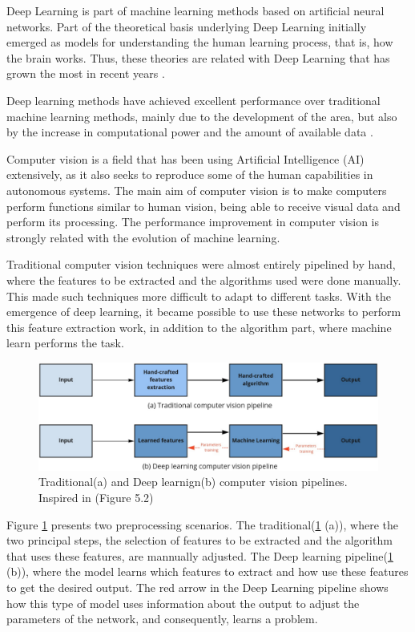 Deep Learning is part of machine learning methods based on artificial neural networks. %
 Part of the theoretical basis underlying Deep Learning  initially emerged as models for understanding the human learning process, that is, how the brain works. Thus, these theories are related with Deep Learning  that has grown the most in recent years \cite{goodfellow2016}.

Deep learning methods have achieved excellent performance over traditional machine learning methods, mainly due to the development of the area, but also by the increase in computational power and the amount of available data \cite{geron2019}. 

Computer vision is a field that has been using Artificial Intelligence (AI) extensively, as it also seeks to reproduce some of the human capabilities in autonomous systems. The main aim of computer vision is to make computers perform functions similar to human vision, being able to receive visual data and perform its processing. The performance improvement in computer vision is strongly related with the evolution of machine learning.

Traditional computer vision techniques were almost entirely pipelined by hand, where the features to be extracted and the algorithms used were done manually. This made such techniques more difficult to adapt to different tasks. With the emergence of deep learning, it became possible to use these networks to perform this feature extraction work, in addition to the algorithm part, where machine learn performs the task.

\begin{figure}
    \centering
    \includegraphics[scale=0.20]{images/cvpipeline.png}
    \caption{Traditional(a) and Deep learnign(b) computer vision pipelines. Inspired in \cite{szeliski2010computer}(Figure 5.2)}
    \label{fig:figurecvpipeline}
\end{figure}

Figure \ref{fig:figurecvpipeline} presents two preprocessing scenarios. The traditional(\ref{fig:figurecvpipeline} (a)), where the two principal steps, the selection of features to be extracted and the algorithm that uses these features, are mannually adjusted. The Deep learning pipeline(\ref{fig:figurecvpipeline} (b)), where the model learns which features to extract and how use these features to get the desired output. The red arrow in the Deep Learning pipeline shows how this type of model uses information about the output to adjust the parameters of the network, and consequently, learns a problem.

